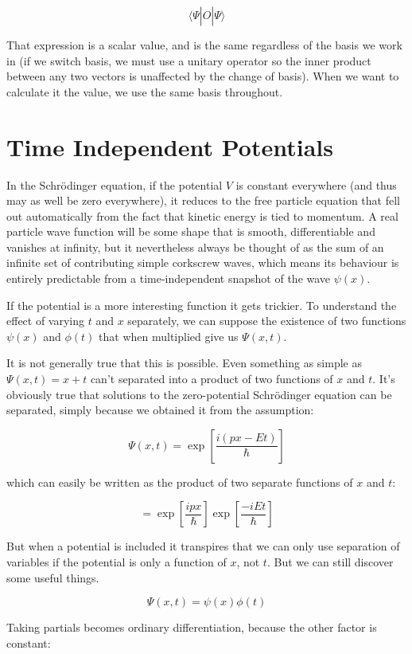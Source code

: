 $$
\langle \Psi| \hat{O} | \Psi \rangle
$$

That expression is a scalar value, and is the same regardless of the basis we work in (if we switch basis, we must use a unitary operator so the inner product between any two vectors is unaffected by the change of basis). When we want to calculate it the value, we use the same basis throughout.

\section{Time Independent Potentials}

In the Schrödinger equation, if the potential $V$ is constant everywhere (and thus may as well be zero everywhere), it reduces to the free particle equation that fell out automatically from the fact that kinetic energy is tied to momentum. A real particle wave function will be some shape that is smooth, differentiable and vanishes at infinity, but it nevertheless always be thought of as the sum of an infinite set of contributing simple corkscrew waves, which means its behaviour is entirely predictable from a time-independent snapshot of the wave $\psi(x)$.

If the potential is a more interesting function it gets trickier. To understand the effect of varying $t$ and $x$ separately, we can suppose the existence of two functions $\psi(x)$ and $\phi(t)$ that when multiplied give us $\Psi(x, t)$.

It is not generally true that this is possible. Even something as simple as $\Psi(x, t) = x + t$ can't separated into a product of two functions of $x$ and $t$. It's obviously true that solutions to the zero-potential Schrödinger equation can be separated, simply because we obtained it from the assumption:

$$
\Psi(x, t) = \exp \left[ {\frac{i(px - Et)}{\hbar}} \right]
$$

which can easily be written as the product of two separate functions of $x$ and $t$:

$$
= \exp \left[ {\frac{ipx}{\hbar}} \right]
\exp \left[ {\frac{-iEt}{\hbar}} \right]
$$

But when a potential is included it transpires that we can only use separation of variables if the potential is only a function of $x$, not $t$. But we can still discover some useful things.

$$\Psi(x, t) = \psi(x) \phi(t)$$

Taking partials becomes ordinary differentiation, because the other factor is constant:

